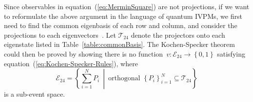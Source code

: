 \documentclass[english,reprint, aps, prl,superscriptaddress, showpacs,
showkeys, longbibliography, amsmath, amssymb]{revtex4-1}
\theoremstyle{plain}
\theoremstyle{definition}
\newcommand{\events}{\ensuremath{\mathcal{E}}}
\newcommand{\set}[2]{\ensuremath{\left\{ {#1}~\middle|~{#2}\right\} }}
\begin{document}
Since observables in equation~(\ref{eq:MerminSquare}) are not projections,
if we want to reformulate the above argument in the language of quantum
IVPMs, we first need to find the common eigenbasis of each row and
column, and consider the projections to each eigenvectors~\cite{Kernaghan1994,peres1995quantum}.
Let $\mathcal{T}_{24}$ denote the projectors onto each eigenstate
listed in Table~\ref{table:commonBasis}. The Kochen-Specker theorem
could then be proved by showing there is no function~$v:\events_{24}\rightarrow\left\{ 0,1\right\} $
satisfying equation~(\ref{eq:Kochen-Specker-Rules}), where 
\begin{equation}
\events_{24}=\set{\sum_{i=1}^{N}P_{i}}{\textrm{orthogonal }\left\{ P_{i}\right\} _{i=1}^{N}\subseteq\mathcal{T}_{24}}
\end{equation}
is a sub-event space.
\end{document}
